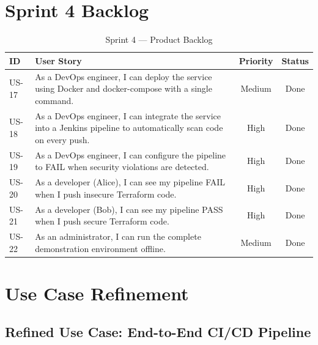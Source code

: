 \section{Sprint 4 Backlog}

\begin{table}[H]
\centering
\caption{Sprint 4 — Product Backlog}
\label{tab:sprint4-backlog}
\begin{tabular}{|p{0.8cm}|p{8.5cm}|c|c|}
\hline
\textbf{ID} & \textbf{User Story} & \textbf{Priority} & \textbf{Status} \\
\hline
US-17 & As a DevOps engineer, I can deploy the service using Docker and docker-compose with a single command. & Medium & Done \\
\hline
US-18 & As a DevOps engineer, I can integrate the service into a Jenkins pipeline to automatically scan code on every push. & High & Done \\
\hline
US-19 & As a DevOps engineer, I can configure the pipeline to FAIL when security violations are detected. & High & Done \\
\hline
US-20 & As a developer (Alice), I can see my pipeline FAIL when I push insecure Terraform code. & High & Done \\
\hline
US-21 & As a developer (Bob), I can see my pipeline PASS when I push secure Terraform code. & High & Done \\
\hline
US-22 & As an administrator, I can run the complete demonstration environment offline. & Medium & Done \\
\hline
\end{tabular}
\end{table}

\section{Use Case Refinement}

\subsection{Refined Use Case: End-to-End CI/CD Pipeline}


